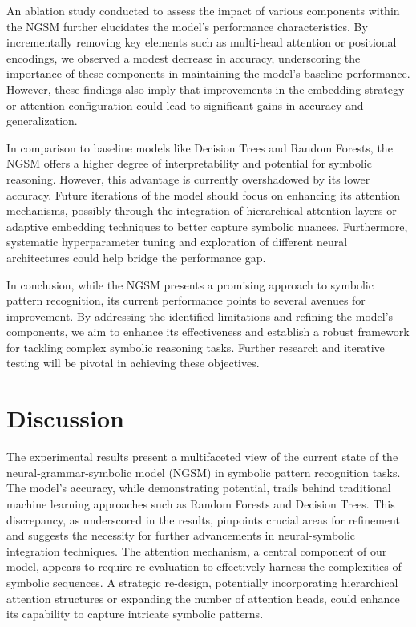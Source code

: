 \documentclass{article}
\begin{document}
An ablation study conducted to assess the impact of various components within the NGSM further elucidates the model's performance characteristics. By incrementally removing key elements such as multi-head attention or positional encodings, we observed a modest decrease in accuracy, underscoring the importance of these components in maintaining the model's baseline performance. However, these findings also imply that improvements in the embedding strategy or attention configuration could lead to significant gains in accuracy and generalization.

In comparison to baseline models like Decision Trees and Random Forests, the NGSM offers a higher degree of interpretability and potential for symbolic reasoning. However, this advantage is currently overshadowed by its lower accuracy. Future iterations of the model should focus on enhancing its attention mechanisms, possibly through the integration of hierarchical attention layers or adaptive embedding techniques to better capture symbolic nuances. Furthermore, systematic hyperparameter tuning and exploration of different neural architectures could help bridge the performance gap.

In conclusion, while the NGSM presents a promising approach to symbolic pattern recognition, its current performance points to several avenues for improvement. By addressing the identified limitations and refining the model's components, we aim to enhance its effectiveness and establish a robust framework for tackling complex symbolic reasoning tasks. Further research and iterative testing will be pivotal in achieving these objectives.

\section{Discussion}
The experimental results present a multifaceted view of the current state of the neural-grammar-symbolic model (NGSM) in symbolic pattern recognition tasks. The model's accuracy, while demonstrating potential, trails behind traditional machine learning approaches such as Random Forests and Decision Trees. This discrepancy, as underscored in the results, pinpoints crucial areas for refinement and suggests the necessity for further advancements in neural-symbolic integration techniques. The attention mechanism, a central component of our model, appears to require re-evaluation to effectively harness the complexities of symbolic sequences. A strategic re-design, potentially incorporating hierarchical attention structures or expanding the number of attention heads, could enhance its capability to capture intricate symbolic patterns.
\end{document}
